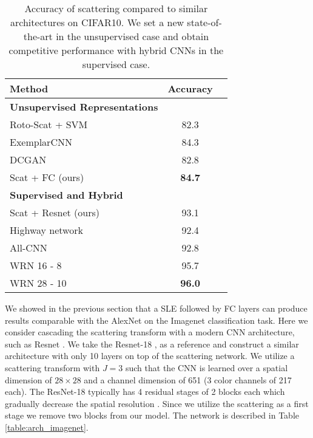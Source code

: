 \documentclass[10pt,twocolumn,letterpaper]{article}
\begin{document}
\begin{table}
\begin{center}
\begin{tabular}{|l|c|c|}
\hline
\bf Method & \bf Accuracy \\
  \hline 

\small \bf Unsupervised Representations   &  \\
Roto-Scat + SVM   \cite{oyallon2015deep}  &82.3\\
ExemplarCNN \cite{dosovitskiy2014discriminative} & 84.3 \\
DCGAN \cite{radford2015unsupervised}& 82.8 \\
Scat + FC   (ours)     & \bf 84.7\\
\hline
\small \bf Supervised and Hybrid    &  \\
Scat + Resnet  (ours) & 93.1       \\
Highway  network \cite{srivastava2015highway}& 92.4 \\
All-CNN \cite{springenberg2014striving}& 92.8 \\
WRN 16 - 8 \cite{zagoruyko2016wide}  & 95.7\\
WRN 28 - 10 \cite{zagoruyko2016wide} &  \textbf{96.0} \\
\hline
\end{tabular}
\end{center}
\label{tab:CIFAR_Main}
\caption{Accuracy of scattering compared to similar architectures on CIFAR10. We set a new state-of-the-art in the unsupervised case and obtain competitive performance with hybrid CNNs in the supervised case.}
\end{table}

We showed in the previous section that a SLE followed by FC layers can produce results comparable with the AlexNet \cite{krizhevsky2012imagenet} on the Imagenet classification task. Here we consider cascading the scattering transform with a modern CNN architecture, such as Resnet \cite{zagoruyko2016wide,he2015deep}. We take the Resnet-18 \cite{zagoruyko2016wide}, as a reference and construct a similar architecture with only 10 layers on top of the scattering network.  We utilize a scattering transform with $J=3$ such that the CNN is learned over a spatial dimension of $28 \times 28$ and a channel dimension of 651 (3 color channels of 217 each). The ResNet-18 typically has 4 residual stages of 2 blocks each which gradually decrease the spatial resolution \cite{zagoruyko2016wide}. Since we utilize the scattering as a first stage we remove two blocks from our model. The network is described in Table \ref{table:arch_imagenet}.
\end{document}
